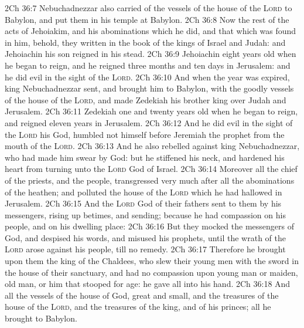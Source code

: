 \vs 2Ch 36:7 Nebuchadnezzar also carried of the vessels of the house of the \textsc{Lord} to Babylon, and put them in his temple at Babylon.
\vs 2Ch 36:8 Now the rest of the acts of Jehoiakim, and his abominations which he did, and that which was found in him, behold, they  written in the book of the kings of Israel and Judah: and Jehoiachin his son reigned in his stead.
\vs 2Ch 36:9 Jehoiachin  eight years old when he began to reign, and he reigned three months and ten days in Jerusalem: and he did  evil in the sight of the \textsc{Lord}.
\vs 2Ch 36:10 And when the year was expired, king Nebuchadnezzar sent, and brought him to Babylon, with the goodly vessels of the house of the \textsc{Lord}, and made Zedekiah his brother king over Judah and Jerusalem.
\vs 2Ch 36:11 Zedekiah  one and twenty years old when he began to reign, and reigned eleven years in Jerusalem.
\vs 2Ch 36:12 And he did  evil in the sight of the \textsc{Lord} his God,  humbled not himself before Jeremiah the prophet  from the mouth of the \textsc{Lord}.
\vs 2Ch 36:13 And he also rebelled against king Nebuchadnezzar, who had made him swear by God: but he stiffened his neck, and hardened his heart from turning unto the \textsc{Lord} God of Israel.
\vs 2Ch 36:14 Moreover all the chief of the priests, and the people, transgressed very much after all the abominations of the heathen; and polluted the house of the \textsc{Lord} which he had hallowed in Jerusalem.
\vs 2Ch 36:15 And the \textsc{Lord} God of their fathers sent to them by his messengers, rising up betimes, and sending; because he had compassion on his people, and on his dwelling place:
\vs 2Ch 36:16 But they mocked the messengers of God, and despised his words, and misused his prophets, until the wrath of the \textsc{Lord} arose against his people, till  no remedy.
\vs 2Ch 36:17 Therefore he brought upon them the king of the Chaldees, who slew their young men with the sword in the house of their sanctuary, and had no compassion upon young man or maiden, old man, or him that stooped for age: he gave  all into his hand.
\vs 2Ch 36:18 And all the vessels of the house of God, great and small, and the treasures of the house of the \textsc{Lord}, and the treasures of the king, and of his princes; all  he brought to Babylon.
